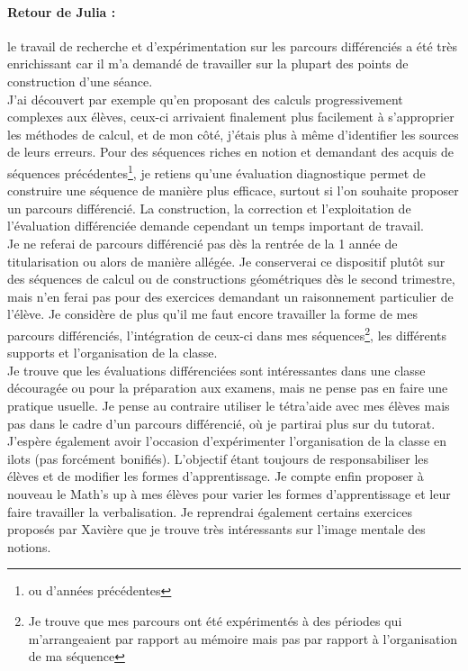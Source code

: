 \paragraph*{Retour de Julia :}
le travail de recherche et d'expérimentation sur les parcours différenciés a été très enrichissant car il m'a demandé de travailler sur la plupart des points de construction d'une séance. \\
J'ai découvert par exemple qu'en proposant des calculs progressivement complexes aux élèves, ceux-ci arrivaient finalement plus facilement à s'approprier les méthodes de calcul, et de mon côté, j'étais plus à même d'identifier les sources de leurs erreurs. Pour des séquences riches en notion et demandant des acquis de séquences précédentes\footnote{ou d'années précédentes}, je retiens qu'une évaluation diagnostique permet de construire une séquence de manière plus efficace, surtout si l'on souhaite proposer un parcours différencié. La construction, la correction et l'exploitation de l'évaluation différenciée demande cependant un temps important de travail.\\
Je ne referai de parcours différencié pas dès la rentrée de la 1 année de titularisation ou alors de manière allégée. Je conserverai ce dispositif plutôt sur des séquences de calcul ou de constructions géométriques dès le second trimestre, mais n'en ferai pas pour des exercices demandant un raisonnement particulier de l'élève. Je considère de plus qu'il me faut encore travailler la forme de mes parcours différenciés, l'intégration de ceux-ci dans mes séquences\footnote{Je trouve que mes parcours ont été expérimentés à des périodes qui m'arrangeaient par rapport au mémoire mais pas par rapport à l'organisation de ma séquence}, les différents supports et l'organisation de la classe.\\
Je trouve que les évaluations différenciées sont intéressantes dans une classe découragée ou pour la préparation aux examens, mais ne pense pas en faire une pratique usuelle. Je pense au contraire utiliser le tétra'aide avec mes élèves mais pas dans le cadre d'un parcours différencié, où je partirai plus sur du tutorat. J'espère également avoir l'occasion d'expérimenter l'organisation de la classe en ilots (pas forcément bonifiés). L'objectif étant toujours de responsabiliser les élèves et de modifier les formes d'apprentissage. Je compte enfin proposer à nouveau le \og Math's up\fg{} à mes élèves pour varier les formes d'apprentissage et leur faire travailler la verbalisation. Je reprendrai également certains exercices proposés par Xavière que je trouve très intéressants sur l'image mentale des notions.

